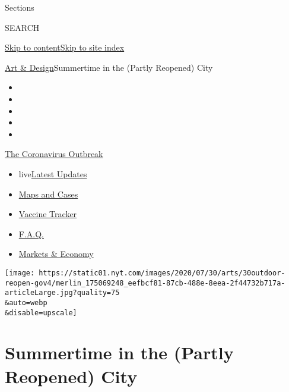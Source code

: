 Sections

SEARCH

\protect\hyperlink{site-content}{Skip to
content}\protect\hyperlink{site-index}{Skip to site index}

\href{/section/arts/design}{Art \& Design}\textbar{}Summertime in the
(Partly Reopened) City

\begin{itemize}
\item
\item
\item
\item
\item
\end{itemize}

\href{https://www.nytimes.com/news-event/coronavirus?action=click\&pgtype=Article\&state=default\&region=TOP_BANNER\&context=storylines_menu}{The
Coronavirus Outbreak}

\begin{itemize}
\tightlist
\item
  live\href{https://www.nytimes.com/2020/08/08/world/coronavirus-updates.html?action=click\&pgtype=Article\&state=default\&region=TOP_BANNER\&context=storylines_menu}{Latest
  Updates}
\item
  \href{https://www.nytimes.com/interactive/2020/us/coronavirus-us-cases.html?action=click\&pgtype=Article\&state=default\&region=TOP_BANNER\&context=storylines_menu}{Maps
  and Cases}
\item
  \href{https://www.nytimes.com/interactive/2020/science/coronavirus-vaccine-tracker.html?action=click\&pgtype=Article\&state=default\&region=TOP_BANNER\&context=storylines_menu}{Vaccine
  Tracker}
\item
  \href{https://www.nytimes.com/interactive/2020/world/coronavirus-tips-advice.html?action=click\&pgtype=Article\&state=default\&region=TOP_BANNER\&context=storylines_menu}{F.A.Q.}
\item
  \href{https://www.nytimes.com/live/2020/08/07/business/stock-market-today-coronavirus?action=click\&pgtype=Article\&state=default\&region=TOP_BANNER\&context=storylines_menu}{Markets
  \& Economy}
\end{itemize}

\texttt{[image: https://static01.nyt.com/images/2020/07/30/arts/30outdoor-reopen-gov4/merlin\_175069248\_eefbcf81-87cb-488e-8eea-2f44732b717a-articleLarge.jpg?quality=75\\\&auto=webp\\\&disable=upscale]}

\hypertarget{summertime-in-the-partly-reopened-city}{%
\section{Summertime in the (Partly Reopened)
City}\label{summertime-in-the-partly-reopened-city}}

